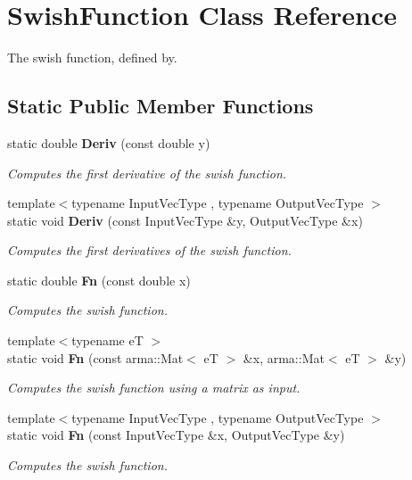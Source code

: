 \section{Swish\+Function Class Reference}
\label{classmlpack_1_1ann_1_1SwishFunction}


The swish function, defined by.  


\subsection*{Static Public Member Functions}
\begin{DoxyCompactItemize}
\item 
static double \textbf{ Deriv} (const double y)
\begin{DoxyCompactList}\small\item\em Computes the first derivative of the swish function. \end{DoxyCompactList}\item 
{\footnotesize template$<$typename Input\+Vec\+Type , typename Output\+Vec\+Type $>$ }\\static void \textbf{ Deriv} (const Input\+Vec\+Type \&y, Output\+Vec\+Type \&x)
\begin{DoxyCompactList}\small\item\em Computes the first derivatives of the swish function. \end{DoxyCompactList}\item 
static double \textbf{ Fn} (const double x)
\begin{DoxyCompactList}\small\item\em Computes the swish function. \end{DoxyCompactList}\item 
{\footnotesize template$<$typename eT $>$ }\\static void \textbf{ Fn} (const arma\+::\+Mat$<$ eT $>$ \&x, arma\+::\+Mat$<$ eT $>$ \&y)
\begin{DoxyCompactList}\small\item\em Computes the swish function using a matrix as input. \end{DoxyCompactList}\item 
{\footnotesize template$<$typename Input\+Vec\+Type , typename Output\+Vec\+Type $>$ }\\static void \textbf{ Fn} (const Input\+Vec\+Type \&x, Output\+Vec\+Type \&y)
\begin{DoxyCompactList}\small\item\em Computes the swish function. \end{DoxyCompactList}\end{DoxyCompactItemize}


